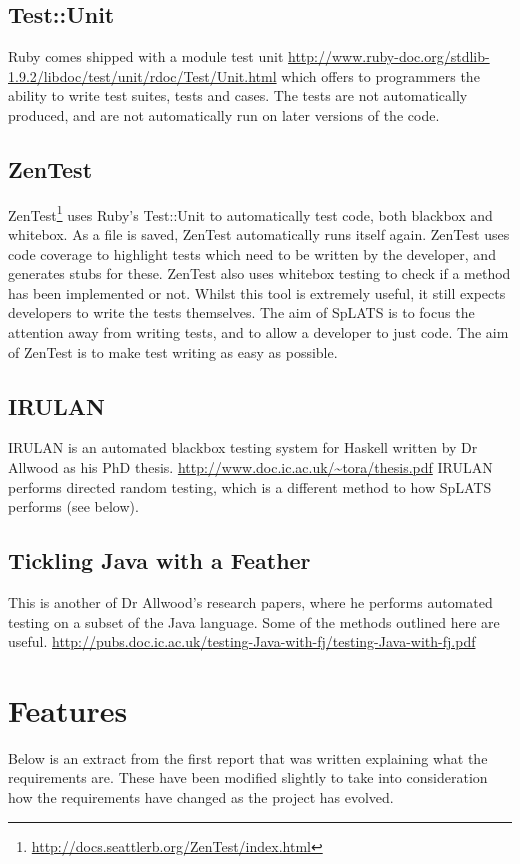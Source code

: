 \documentclass{report}
\begin{document}
\subsection{Test::Unit}
Ruby comes shipped with a module test unit \url{http://www.ruby-doc.org/stdlib-1.9.2/libdoc/test/unit/rdoc/Test/Unit.html} which offers to programmers the ability to write test suites, tests and cases. The tests are not automatically produced, and are not automatically run on later versions of the code.
\subsection{ZenTest}
ZenTest\footnote{\url{http://docs.seattlerb.org/ZenTest/index.html}} uses Ruby's Test::Unit to automatically test code, both blackbox and whitebox. As a file is saved, ZenTest automatically runs itself again. ZenTest uses code coverage to highlight tests which need to be written by the developer, and generates stubs for these. ZenTest also uses whitebox testing to check if a method has been implemented or not. Whilst this tool is extremely useful, it still expects developers to write the tests themselves. The aim of SpLATS is to focus the attention away from writing tests, and to allow a developer to just code. The aim of ZenTest is to make test writing as easy as possible.
\subsection{IRULAN}
IRULAN is an automated blackbox testing system for Haskell written by Dr Allwood as his PhD thesis. \url{http://www.doc.ic.ac.uk/~tora/thesis.pdf} IRULAN performs directed random testing, which is a different method to how SpLATS performs (see below).
\subsection{Tickling Java with a Feather}
This is another of Dr Allwood's research papers, where he performs automated testing on a subset of the Java language. Some of the methods outlined here are useful. \url{http://pubs.doc.ic.ac.uk/testing-Java-with-fj/testing-Java-with-fj.pdf}

\section{Features}
Below is an extract from the first report that was written explaining what the requirements are. These have been modified slightly to take into consideration how the requirements have changed as the project has evolved.
\end{document}
